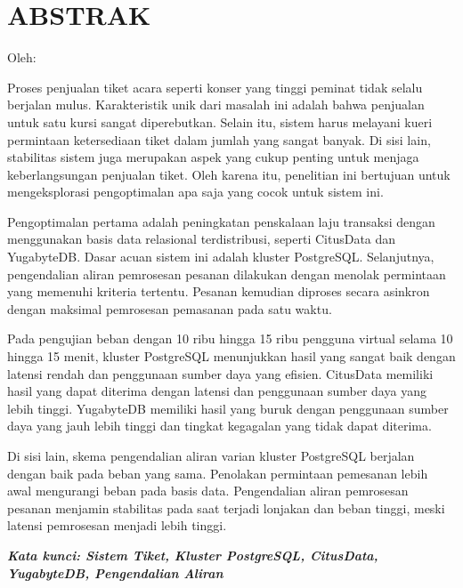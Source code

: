 \clearpage
\chapter*{ABSTRAK}
\begin{center}
  \center
  \begin{singlespace}
    \large\bfseries\MakeUppercase{\thetitle}

    \normalfont\normalsize
    Oleh:

    \bfseries \theauthor
  \end{singlespace}
\end{center}

\begin{singlespace}
  \small
  Proses penjualan tiket acara seperti konser yang tinggi peminat tidak selalu berjalan mulus. Karakteristik unik dari masalah ini adalah bahwa penjualan untuk satu kursi sangat diperebutkan. Selain itu, sistem harus melayani kueri permintaan ketersediaan tiket dalam jumlah yang sangat banyak. Di sisi lain, stabilitas sistem juga merupakan aspek yang cukup penting untuk menjaga keberlangsungan penjualan tiket. Oleh karena itu, penelitian ini bertujuan untuk mengeksplorasi pengoptimalan apa saja yang cocok untuk sistem ini.

  Pengoptimalan pertama adalah peningkatan penskalaan laju transaksi dengan menggunakan basis data relasional terdistribusi, seperti CitusData dan YugabyteDB. Dasar acuan sistem ini adalah kluster PostgreSQL. Selanjutnya, pengendalian aliran pemrosesan pesanan dilakukan dengan menolak permintaan yang memenuhi kriteria tertentu. Pesanan kemudian diproses secara asinkron dengan maksimal pemrosesan pemasanan pada satu waktu.

  Pada pengujian beban dengan 10 ribu hingga 15 ribu pengguna virtual selama 10 hingga 15 menit, kluster PostgreSQL menunjukkan hasil yang sangat baik dengan latensi rendah dan penggunaan sumber daya yang efisien. CitusData memiliki hasil yang dapat diterima dengan latensi dan penggunaan sumber daya yang lebih tinggi. YugabyteDB memiliki hasil yang buruk dengan penggunaan sumber daya yang jauh lebih tinggi dan tingkat kegagalan yang tidak dapat diterima.

  Di sisi lain, skema pengendalian aliran varian kluster PostgreSQL berjalan dengan baik pada beban yang sama. Penolakan permintaan pemesanan lebih awal mengurangi beban pada basis data. Pengendalian aliran pemrosesan pesanan menjamin stabilitas pada saat terjadi lonjakan dan beban tinggi, meski latensi pemrosesan menjadi lebih tinggi.

  \textbf{\textit{Kata kunci: Sistem Tiket, Kluster PostgreSQL, CitusData, YugabyteDB, Pengendalian Aliran}}

\end{singlespace}
\clearpage